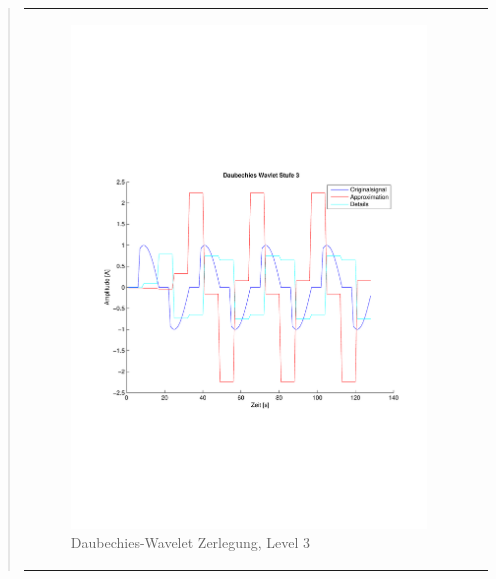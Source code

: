 \begin{quote}
\begin{center}
\begin{tabular}{ll}
\begin{minipage}{0.6\textwidth}
                    \end{minipage}
                    \begin{minipage}{0.6\textwidth}
    
                        \begin{figure}[H]
                            \label{fig:}
                            \includegraphics[scale=0.4, trim = 2cm 6cm 1cm
                            7.5cm,
                            clip]{./Bilder/Termin8/Daubechies_Wavlet_lvl_3}
                            \caption{Daubechies-Wavelet Zerlegung, Level 3}
                        \end{figure}
                    \vspace{-1.5em}
    
                    \end{minipage}
    

\end{tabular}
\end{center}
\end{quote}
